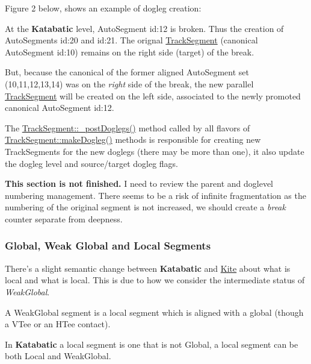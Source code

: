 Figure 2 below, shows an example of dogleg creation\-:
\begin{DoxyItemize}
\item At the {\bf Katabatic} level, Auto\-Segment {\ttfamily id\-:12} is broken. Thus the creation of Auto\-Segments {\ttfamily id\-:20} and {\ttfamily id\-:21}. The orignal \hyperlink{classKite_1_1TrackSegment}{Track\-Segment} (canonical Auto\-Segment {\ttfamily id\-:10}) remains on the right side (target) of the break.
\item But, because the canonical of the former aligned Auto\-Segment set {\ttfamily }(10,11,12,13,14) was on the {\itshape right} side of the break, the new parallel \hyperlink{classKite_1_1TrackSegment}{Track\-Segment} will be created on the {\ttfamily left} side, associated to the newly promoted canonical Auto\-Segment {\ttfamily id\-:12}.
\end{DoxyItemize}

 The \hyperlink{classKite_1_1TrackSegment_a10a45c049d0bd7d01c7eff1c5441c7a2}{Track\-Segment\-::\-\_\-post\-Doglegs()} method called by all flavors of \hyperlink{classKite_1_1TrackSegment_a7a9637875364e84e6862de0102341715}{Track\-Segment\-::make\-Dogleg()} methods is responsible for creating new Track\-Segments for the new doglegs (there may be more than one), it also update the dogleg level and source/target dogleg flags.

{\bfseries This section is not finished.} I need to review the parent and doglevel numbering management. There seems to be a risk of infinite fragmentation as the numbering of the original segment is not increased, we should create a {\itshape break} counter separate from deepness.\hypertarget{classKite_1_1TrackSegment_secWeakGlobal}{}\subsubsection{Global, Weak Global and Local Segments}\label{classKite_1_1TrackSegment_secWeakGlobal}
There's a slight semantic change between {\bf Katabatic} and \hyperlink{namespaceKite}{Kite} about what is local and what is local. This is due to how we consider the intermediate status of {\itshape Weak\-Global}.

A {\ttfamily Weak\-Global} segment is a local segment which is aligned with a global (though a V\-Tee or an H\-Tee contact).

In {\bf Katabatic} a local segment is one that is not {\ttfamily Global}, a local segment can be both {\ttfamily Local} and {\ttfamily Weak\-Global}.

